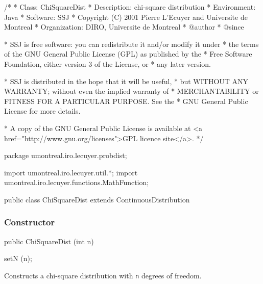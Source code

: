 \begin{code}
\begin{hide}
/*
 * Class:        ChiSquareDist
 * Description:  chi-square distribution
 * Environment:  Java
 * Software:     SSJ 
 * Copyright (C) 2001  Pierre L'Ecuyer and Universite de Montreal
 * Organization: DIRO, Universite de Montreal
 * @author       
 * @since

 * SSJ is free software: you can redistribute it and/or modify it under
 * the terms of the GNU General Public License (GPL) as published by the
 * Free Software Foundation, either version 3 of the License, or
 * any later version.

 * SSJ is distributed in the hope that it will be useful,
 * but WITHOUT ANY WARRANTY; without even the implied warranty of
 * MERCHANTABILITY or FITNESS FOR A PARTICULAR PURPOSE.  See the
 * GNU General Public License for more details.

 * A copy of the GNU General Public License is available at
   <a href="http://www.gnu.org/licenses">GPL licence site</a>.
 */
\end{hide}
package umontreal.iro.lecuyer.probdist;
\begin{hide}
import umontreal.iro.lecuyer.util.*;
import umontreal.iro.lecuyer.functions.MathFunction;
\end{hide}

public class ChiSquareDist extends ContinuousDistribution\begin{hide} {
   protected int n;
   protected double C1;

   private static class Function implements MathFunction {
      protected int n;
      protected double sumLog;

      public Function (double s, int n)
      {
         this.n = n;
         this.sumLog = s;
      }

      public double evaluate (double k)
      {
         if (k < 1.0) return 1.0e200;
         return (sumLog + n * (Num.lnGamma (k / 2.0) - 0.5*Num.LN2 - Num.lnGamma ((k + 1.0) / 2.0)));
      }
   }
\end{hide}
\end{code}
\subsubsection* {Constructor}

\begin{code}

   public ChiSquareDist (int n)\begin{hide} {
      setN (n);
   }\end{hide}
\end{code}
\begin{tabb}
   Constructs a chi-square distribution with \texttt{n} degrees of freedom.
\end{tabb}

